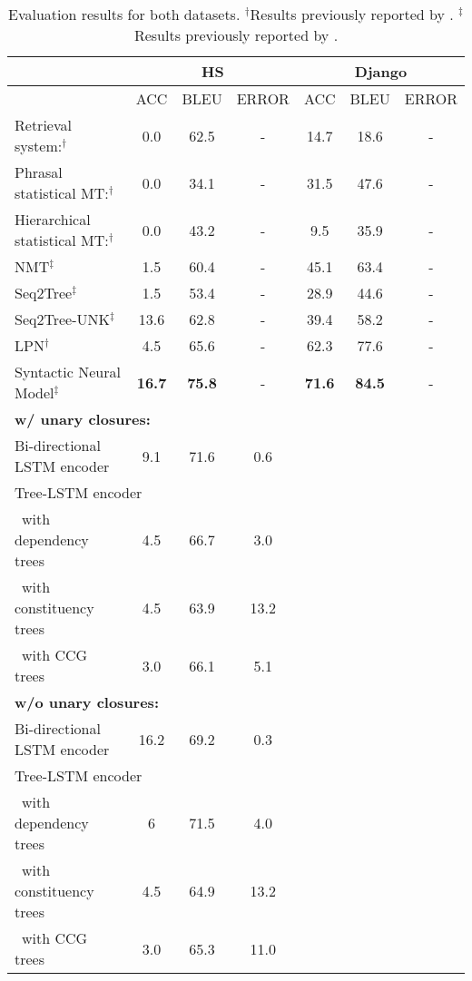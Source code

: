 \begin{table}
\begin{tabular}[h]{ l c c c c c c }

\hline
& \multicolumn{3}{c}{\textbf{HS}} & \multicolumn{3}{c}{\textbf{Django}}\\
\hline
& ACC & BLEU & ERROR & ACC & BLEU & ERROR \\
\hline
Retrieval system:$^\dagger$ & 0.0 & 62.5 & - & 14.7 & 18.6 & - \\
Phrasal statistical MT:$^\dagger$ & 0.0 & 34.1 & - & 31.5 & 47.6 & - \\
Hierarchical statistical MT:$^\dagger$ & 0.0 & 43.2 & - & 9.5 & 35.9 & - \\
\hline 
NMT$^\ddagger$ & 1.5 & 60.4 & - & 45.1 & 63.4 & - \\
Seq2Tree$^\ddagger$ & 1.5 & 53.4 & - & 28.9 & 44.6 & - \\
Seq2Tree-UNK$^\ddagger$ & 13.6 & 62.8 & - & 39.4 & 58.2 & - \\
LPN$^\dagger$ & 4.5 & 65.6 & - & 62.3 & 77.6 & - \\
Syntactic Neural Model$^\ddagger$ & \textbf{16.7} & \textbf{75.8} & - & \textbf{71.6} & \textbf{84.5} & - \\
\hline
\multicolumn{7}{l}{\textbf{w/ unary closures:}}\\
Bi-directional LSTM encoder & 9.1 & 71.6 & 0.6 &  \\
\multicolumn{7}{l}{Tree-LSTM encoder} \\
\ with dependency trees & 4.5 & 66.7 & 3.0 &  \\
\ with constituency trees & 4.5 & 63.9 & 13.2 &  \\
\ with CCG trees & 3.0 & 66.1 & 5.1 &  \\
\multicolumn{7}{l}{\textbf{w/o unary closures:}}\\
Bi-directional LSTM encoder & 16.2 & 69.2 & 0.3 &  \\
\multicolumn{7}{l}{Tree-LSTM encoder} \\
\ with dependency trees & 6 & 71.5 & 4.0 &  \\
\ with constituency trees & 4.5 & 64.9 & 13.2 &  \\
\ with CCG trees & 3.0 & 65.3 & 11.0 &  \\
\hline
\end{tabular}
\caption[Final results]{Evaluation results for both datasets. $^\dagger$Results previously reported by \cite{Ling2016}. $^\ddagger$Results previously reported by \cite{Yin2017}.}
\label{table:evaluation}
\end{table}




